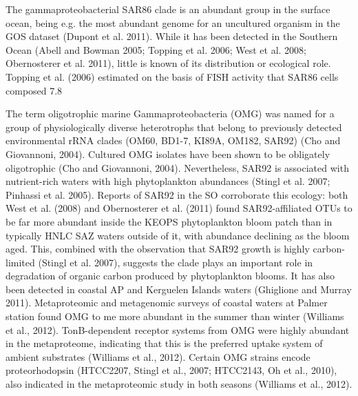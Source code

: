 

The gammaproteobacterial SAR86 clade is an abundant group in the surface ocean, being e.g. the most abundant genome for an uncultured organism in the GOS dataset (Dupont et al. 2011). While it has been detected in the Southern Ocean (Abell and Bowman 2005; Topping et al. 2006; West et al. 2008; Obernosterer et al. 2011), little is known of its distribution or ecological role. Topping et al. (2006) estimated on the basis of FISH activity that SAR86 cells composed 7.8%


The term oligotrophic marine Gammaproteobacteria (OMG) was named for a group of physiologically diverse heterotrophs that belong to previously detected environmental rRNA clades (OM60, BD1-7, KI89A, OM182, SAR92) (Cho and Giovannoni, 2004). Cultured OMG isolates have been shown to be obligately oligotrophic (Cho and Giovannoni, 2004). Nevertheless, SAR92 is associated with nutrient-rich waters with high phytoplankton abundances (Stingl et al. 2007; Pinhassi et al. 2005). Reports of SAR92 in the SO corroborate this ecology: both West et al. (2008) and Obernosterer et al. (2011) found SAR92-affiliated OTUs to be far more abundant inside the KEOPS phytoplankton bloom patch than in typically HNLC SAZ waters outside of it, with abundance declining as the bloom aged. This, combined with the observation that SAR92 growth is highly carbon-limited (Stingl et al. 2007), suggests the clade plays an important role in degradation of organic carbon produced by phytoplankton blooms. It has also been detected in coastal AP and Kerguelen Islands waters (Ghiglione and Murray 2011). Metaproteomic and metagenomic surveys of coastal waters at Palmer station found OMG to me more abundant in the summer than winter (Williams et al., 2012). TonB-dependent receptor systems from OMG were highly abundant in the metaproteome, indicating that this is the preferred uptake system of ambient substrates (Williams et al., 2012). Certain OMG strains encode proteorhodopsin (HTCC2207, Stingl et al., 2007; HTCC2143, Oh et al., 2010), also indicated in the metaproteomic study in both seasons (Williams et al., 2012).



